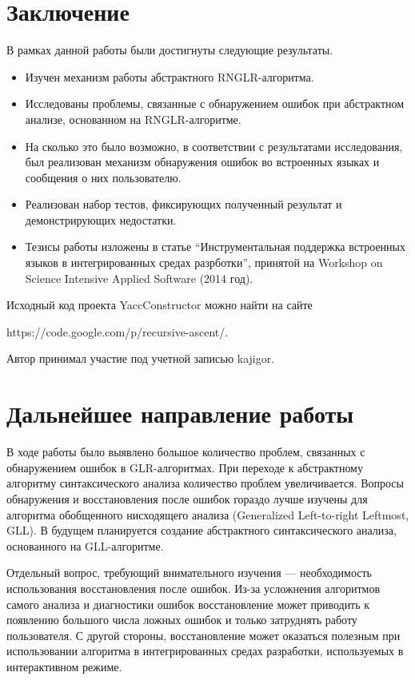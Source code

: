 \documentclass{matmex-diploma}
\begin{document}
\section*{Заключение}
В рамках данной работы были достигнуты следующие результаты.
\begin{itemize}
    \item Изучен механизм работы абстрактного RNGLR-алгоритма.
    \item Исследованы проблемы, связанные с обнаружением ошибок при абстрактном 
    анализе, основанном на RNGLR-алгоритме.
    \item На сколько это было возможно, в соответствии с результатами исследования, 
    был реализован механизм обнаружения ошибок во встроенных языках и сообщения о 
    них пользователю.
    \item Реализован набор тестов, фиксирующих полученный результат и демонстрирующих 
    недостатки.
    \item Тезисы работы изложены в статье “Инструментальная поддержка встроенных 
    языков в интегрированных средах разрботки”, принятой на Workshop on Science 
    Intensive Applied Software (2014 год).
\end{itemize}

Исходный код проекта YaccConstructor можно найти на сайте

https://code.google.com/p/recursive-ascent/. 

Автор принимал участие под учетной записью kajigor.

\section*{Дальнейшее направление работы}
В ходе работы было выявлено большое количество проблем, связанных с обнаружением 
ошибок в GLR-алгоритмах. При переходе к абстрактному алгоритму синтаксического 
анализа количество проблем увеличивается. Вопросы обнаружения и восстановления 
после ошибок гораздо лучше изучены для алгоритма обобщенного нисходящего анализа 
(Generalized Left-to-right Leftmost, GLL). В будущем планируется создание абстрактного 
синтаксического анализа, основанного на GLL-алгоритме. 

Отдельный вопрос, требующий внимательного изучения — необходимость использования 
восстановления после ошибок. Из-за усложнения алгоритмов самого анализа и диагностики 
ошибок восстановление может приводить к появлению большого числа ложных ошибок и 
только затруднять работу пользователя. С другой стороны, восстановление может 
оказаться полезным при использовании алгоритма в интегрированных средах разработки, 
используемых в интерактивном режиме.





\end{document}
